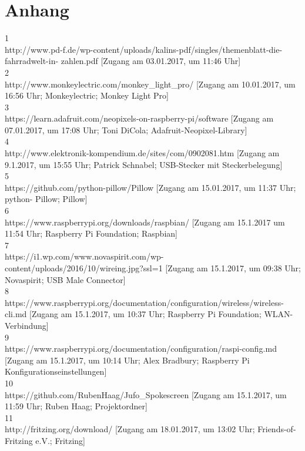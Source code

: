 \documentclass [a4paper, 11pt] {article}
\begin{document}
\section{Anhang}
\begin{sloppypar}
1\\
http://www.pd-f.de/wp-content/uploads/kalins-pdf/singles/themenblatt-die-fahrradwelt-in- zahlen.pdf [Zugang am 03.01.2017, um 11:46 Uhr] \\
2\\
http://www.monkeylectric.com/monkey\_light\_pro/ [Zugang am 10.01.2017, um 16:56 Uhr; Monkeylectric; Monkey Light Pro]\\
3\\
https://learn.adafruit.com/neopixels-on-raspberry-pi/software [Zugang am 07.01.2017, um 17:08 Uhr; Toni DiCola; Adafruit-Neopixel-Library]\\
4\\
http://www.elektronik-kompendium.de/sites/com/0902081.htm [Zugang am 9.1.2017, um 15:55 Uhr; Patrick Schnabel; USB-Stecker mit Steckerbelegung]\\
5\\
https://github.com/python-pillow/Pillow [Zugang am 15.01.2017, um 11:37 Uhr; python- Pillow; Pillow]\\
6\\
https://www.raspberrypi.org/downloads/raspbian/ [Zugang am 15.1.2017 um 11:54 Uhr; Raspberry Pi Foundation; Raspbian]\\
7\\
https://i1.wp.com/www.novaspirit.com/wp-content/uploads/2016/10/wireing.jpg?ssl=1 [Zugang am 15.1.2017, um 09:38 Uhr; Novaspirit; USB Male Connector]\\
8\\
https://www.raspberrypi.org/documentation/configuration/wireless/wireless-cli.md [Zugang am 15.1.2017, um 10:37 Uhr; Raspberry Pi Foundation; WLAN-Verbindung]\\
9\\
https://www.raspberrypi.org/documentation/configuration/raspi-config.md [Zugang am 15.1.2017, um 10:14 Uhr; Alex Bradbury; Raspberry Pi Konfigurationseinstellungen]\\
10\\
https://github.com/RubenHaag/Jufo\_Spokescreen [Zugang am 15.1.2017, um 11:59 Uhr; Ruben Haag; Projektordner]\\
11\\
http://fritzing.org/download/ [Zugang am 18.01.2017, um 13:02 Uhr; Friends-of-Fritzing e.V.; Fritzing]\\

\end{sloppypar}
\end{document}
